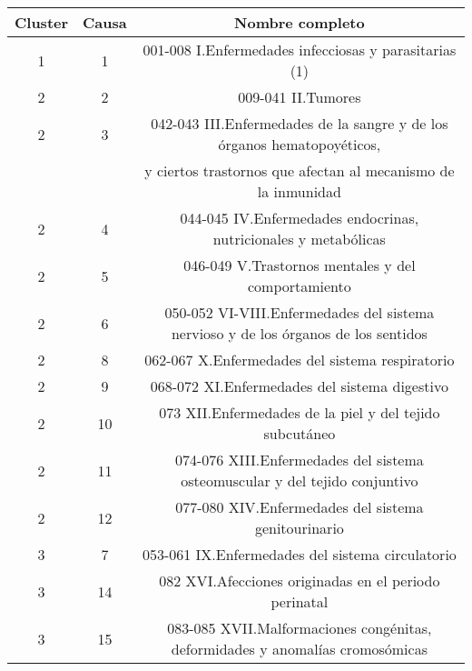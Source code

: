 \documentclass{article}
\begin{document}
\begin{table}[H]
\centering
\begin{tabular}{ccc}
Cluster & Causa        & Nombre completo    \\ \hline \hline
1     &  1  & 001-008  I.Enfermedades infecciosas y parasitarias (1)                              \\ \hline
2                            & 2  & 009-041  II.Tumores                                                                 \\
2                            & 3  & 042-043  III.Enfermedades de la sangre y de los órganos hematopoyéticos,            \\
                           &                 & y ciertos trastornos que afectan al mecanismo de la inmunidad                       \\
2                            & 4  & 044-045  IV.Enfermedades endocrinas, nutricionales y metabólicas                    \\
2                            & 5  & 046-049  V.Trastornos mentales y del comportamiento                                 \\
2                            & 6  & 050-052  VI-VIII.Enfermedades del sistema nervioso y de los órganos de los sentidos \\
2                            & 8  & 062-067  X.Enfermedades del sistema respiratorio                                    \\
2                            & 9  & 068-072  XI.Enfermedades del sistema digestivo                                      \\
2                            & 10 & 073  XII.Enfermedades de la piel y del tejido subcutáneo                            \\
2                            & 11 & 074-076  XIII.Enfermedades del sistema osteomuscular y del tejido conjuntivo        \\
2                            & 12 & 077-080  XIV.Enfermedades del sistema genitourinario                                \\ \hline
3                            & 7  & 053-061 IX.Enfermedades del sistema circulatorio                                    \\
3                            & 14 & 082  XVI.Afecciones originadas en el periodo perinatal                              \\
3                            & 15 & 083-085  XVII.Malformaciones congénitas, deformidades y anomalías cromosómicas      \\

\end{tabular}
\end{table}
\end{document}
